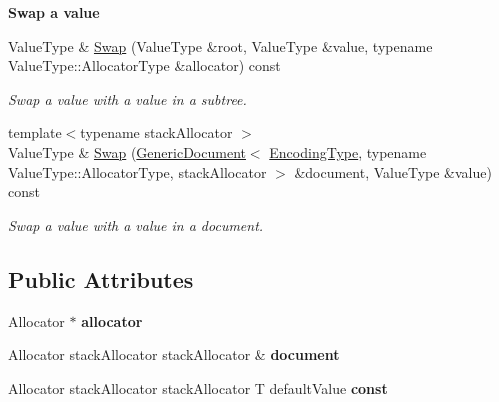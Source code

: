 \begin{Indent}\textbf{ Swap a value}\par
\begin{DoxyCompactItemize}
\item 
Value\+Type \& \hyperlink{classGenericPointer_a3b40ad3e851640e295a4623b624af395}{Swap} (Value\+Type \&root, Value\+Type \&value, typename Value\+Type\+::\+Allocator\+Type \&allocator) const
\begin{DoxyCompactList}\small\item\em Swap a value with a value in a subtree. \end{DoxyCompactList}\item 
\mbox{\label{classGenericPointer_aa84bc7e016c906436f464c8cbd858edb}} 
{\footnotesize template$<$typename stack\+Allocator $>$ }\\Value\+Type \& \hyperlink{classGenericPointer_aa84bc7e016c906436f464c8cbd858edb}{Swap} (\hyperlink{classGenericDocument}{Generic\+Document}$<$ \hyperlink{classGenericPointer_a4b802da797a7a0b615fd9611cedb7c3b}{Encoding\+Type}, typename Value\+Type\+::\+Allocator\+Type, stack\+Allocator $>$ \&document, Value\+Type \&value) const
\begin{DoxyCompactList}\small\item\em Swap a value with a value in a document. \end{DoxyCompactList}\end{DoxyCompactItemize}
\end{Indent}
\subsection*{Public Attributes}
\begin{DoxyCompactItemize}
\item 
\mbox{\label{classGenericPointer_aeb61ba8e67260b43090791eeca8b90e0}} 
Allocator $\ast$ {\bfseries allocator}
\item 
\mbox{\label{classGenericPointer_a646e2825228e0d8331e3a49d7382202b}} 
Allocator stack\+Allocator stack\+Allocator \& {\bfseries document}
\item 
Allocator stack\+Allocator stack\+Allocator T default\+Value {\bfseries const}
\end{DoxyCompactItemize}
